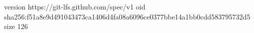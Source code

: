 version https://git-lfs.github.com/spec/v1
oid sha256:f51a8e9d491043473ca1406d4fa08a6096ce0377bbe14a1bb0cdd583795732d5
size 126
